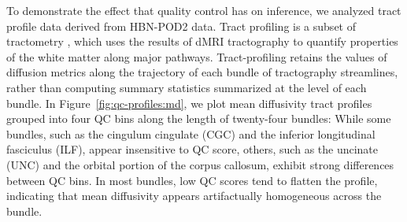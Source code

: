 \documentclass[9pt,lineno]{elife}
\begin{document}
To demonstrate the effect that quality control has on inference, we analyzed
tract profile data derived from HBN-POD2 data. Tract profiling
\citep{yeatman2012-rc,jones2005pasta,colby2012along,odonnell2009tract,
kruper2021evaluating} is a subset of tractometry
\citep{jones2005pasta,bells2011tractometry}, which uses the results of dMRI
tractography to quantify properties of the white matter along major pathways.
Tract-profiling retains the values of diffusion metrics along the trajectory of
each bundle of tractography streamlines, rather than computing summary
statistics summarized at the level of each bundle. In
Figure~\ref{fig:qc-profiles:md}, we plot mean diffusivity tract profiles grouped
into four QC bins along the length of twenty-four bundles: While some bundles,
such as the cingulum cingulate (CGC) and the inferior longitudinal fasciculus
(ILF), appear insensitive to QC score, others, such as the uncinate (UNC) and
the orbital portion of the corpus callosum, exhibit strong differences between
QC bins. In most bundles, low QC scores tend to flatten the profile, indicating that mean diffusivity appears artifactually homogeneous across the bundle.
\end{document}
